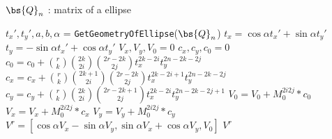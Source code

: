 \begin{algorithm}[t]
\scriptsize
    \algrenewcommand{}
    \caption{Calculate $V_n^r$}
    \label{alg:vnr}
    \hspace*{\algorithmicindent} $\bs{Q}_n$ : matrix of a ellipse
    \begin{algorithmic}[1]
        \State $t_x', t_y', a, b, \alpha$ = \texttt{GetGeometryOfEllipse}($\bs{Q}_n$)
        \State $t_x = \cos\alpha t_x' + \sin\alpha t_y'$ 
        \State $t_y = -\sin\alpha t_x' + \cos\alpha t_y'$ 
        \State $V_x, V_y, V_0 = 0$
                \State $c_x, c_y, c_0=0$
                    \State $c_0 = c_0+ \binom{r}{k} \binom{2k}{2i}\binom{2r-2k}{2j}t_x^{2k-2i}t_y^{2n-2k-2j}$
                    \State $c_x = c_x+ \binom{r}{k} \binom{2k+1}{2i}\binom{2r-2k}{2j}t_x^{2k-2i+1}t_y^{2n-2k-2j}$
                    \State $c_y = c_y+ \binom{r}{k} \binom{2k}{2i}\binom{2r-2k+1}{2j}t_x^{2k-2i}t_y^{2n-2k-2j+1}$
                \EndFor
                \State $V_0 = V_0+M_0^{2i2j}*c_0$
                \State $V_x = V_x+M_0^{2i2j}*c_x$
                \State $V_y = V_y+M_0^{2i2j}*c_y$
            \EndFor
        \EndFor
        \State  $V^r = [\cos\alpha V_x-\sin\alpha V_y, \sin\alpha V_x + \cos\alpha V_y, V_0]$
        \State\Return $V^r$
    \EndFunction
    \end{algorithmic}
\end{algorithm}